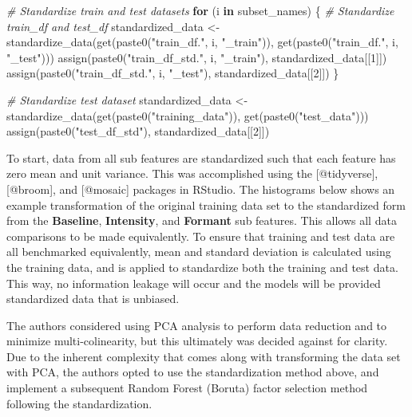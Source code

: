 \documentclass[
]{article}
\newenvironment{Shaded}{\begin{snugshade}}{\end{snugshade}}
\newcommand{\CommentTok}[1]{\textcolor[rgb]{0.56,0.35,0.01}{\textit{#1}}}
\newcommand{\ControlFlowTok}[1]{\textcolor[rgb]{0.13,0.29,0.53}{\textbf{#1}}}
\newcommand{\DecValTok}[1]{\textcolor[rgb]{0.00,0.00,0.81}{#1}}
\newcommand{\FunctionTok}[1]{\textcolor[rgb]{0.00,0.00,0.00}{#1}}
\newcommand{\NormalTok}[1]{#1}
\newcommand{\OtherTok}[1]{\textcolor[rgb]{0.56,0.35,0.01}{#1}}
\newcommand{\StringTok}[1]{\textcolor[rgb]{0.31,0.60,0.02}{#1}}
\begin{document}
\begin{Shaded}
\begin{Highlighting}[]
\CommentTok{\# Standardize train and test datasets}
\ControlFlowTok{for}\NormalTok{ (i }\ControlFlowTok{in}\NormalTok{ subset\_names) \{}
    \CommentTok{\# Standardize train\_df and test\_df}
\NormalTok{    standardized\_data }\OtherTok{\textless{}{-}} \FunctionTok{standardize\_data}\NormalTok{(}\FunctionTok{get}\NormalTok{(}\FunctionTok{paste0}\NormalTok{(}\StringTok{"train\_df."}\NormalTok{, i, }\StringTok{"\_train"}\NormalTok{)),}
        \FunctionTok{get}\NormalTok{(}\FunctionTok{paste0}\NormalTok{(}\StringTok{"train\_df."}\NormalTok{, i, }\StringTok{"\_test"}\NormalTok{)))}
    \FunctionTok{assign}\NormalTok{(}\FunctionTok{paste0}\NormalTok{(}\StringTok{"train\_df\_std."}\NormalTok{, i, }\StringTok{"\_train"}\NormalTok{), standardized\_data[[}\DecValTok{1}\NormalTok{]])}
    \FunctionTok{assign}\NormalTok{(}\FunctionTok{paste0}\NormalTok{(}\StringTok{"train\_df\_std."}\NormalTok{, i, }\StringTok{"\_test"}\NormalTok{), standardized\_data[[}\DecValTok{2}\NormalTok{]])}
\NormalTok{\}}

\CommentTok{\# Standardize test dataset}
\NormalTok{standardized\_data }\OtherTok{\textless{}{-}} \FunctionTok{standardize\_data}\NormalTok{(}\FunctionTok{get}\NormalTok{(}\FunctionTok{paste0}\NormalTok{(}\StringTok{"training\_data"}\NormalTok{)), }\FunctionTok{get}\NormalTok{(}\FunctionTok{paste0}\NormalTok{(}\StringTok{"test\_data"}\NormalTok{)))}
\FunctionTok{assign}\NormalTok{(}\FunctionTok{paste0}\NormalTok{(}\StringTok{"test\_df\_std"}\NormalTok{), standardized\_data[[}\DecValTok{2}\NormalTok{]])}
\end{Highlighting}
\end{Shaded}

\newpage

To start, data from all sub features are standardized such that each feature has zero mean and unit variance. This was accomplished using the {[}@tidyverse{]}, {[}@broom{]}, and {[}@mosaic{]} packages in RStudio. The histograms below shows an example transformation of the original training data set to the standardized form from the \textbf{Baseline}, \textbf{Intensity}, and \textbf{Formant} sub features. This allows all data comparisons to be made equivalently. To ensure that training and test data are all benchmarked equivalently, mean and standard deviation is calculated using the training data, and is applied to standardize both the training and test data. This way, no information leakage will occur and the models will be provided standardized data that is unbiased.

The authors considered using PCA analysis to perform data reduction and to minimize multi-colinearity, but this ultimately was decided against for clarity. Due to the inherent complexity that comes along with transforming the data set with PCA, the authors opted to use the standardization method above, and implement a subsequent Random Forest (Boruta) factor selection method following the standardization.
\end{document}
